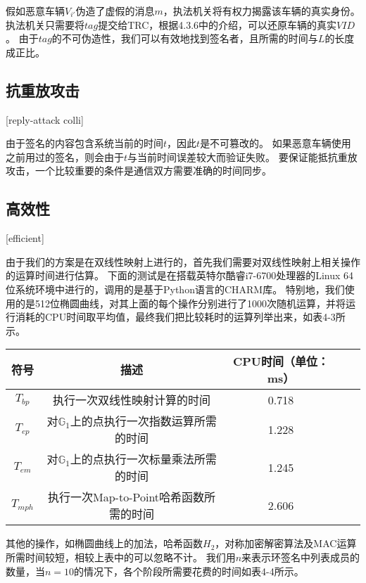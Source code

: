 假如恶意车辆$V_{i'}$伪造了虚假的消息$m$，执法机关将有权力揭露该车辆的真实身份。
执法机关只需要将$tag$提交给TRC，根据4.3.6中的介绍，可以还原车辆的真实$VID$。
由于$tag$的不可伪造性，我们可以有效地找到签名者，且所需的时间与$L$的长度成正比。

\subsection{抗重放攻击}[reply-attack colli]

由于签名的内容包含系统当前的时间$t$，因此$t$是不可篡改的。
如果恶意车辆使用之前用过的签名，则会由于$t$与当前时间误差较大而验证失败。
要保证能抵抗重放攻击，一个比较重要的条件是通信双方需要准确的时间同步。

\subsection{高效性}[efficient]

由于我们的方案是在双线性映射上进行的，首先我们需要对双线性映射上相关操作的运算时间进行估算。
下面的测试是在搭载英特尔酷睿i7-6700处理器的Linux 64位系统环境中进行的，调用的是基于Python语言的CHARM库\cite{charm13}。
特别地，我们使用的是512位椭圆曲线，对其上面的每个操作分别进行了1000次随机运算，并将运行消耗的CPU时间取平均值，最终我们把比较耗时的运算列举出来，如表4-3所示。

\begin{table}[htbp]
\vspace{0.5em}\centering\wuhao
\begin{tabular}{ccccc}
\toprule[1.5pt]
 符号 & 描述 & CPU时间（单位：ms）\\
\midrule[1pt]
 $T_{bp}$ & 执行一次双线性映射计算的时间 & 0.718 \\
 $T_{ep}$ & 对$\mathbb{G}_1$上的点执行一次指数运算所需的时间 & 1.228 \\
 $T_{em}$ & 对$\mathbb{G}_1$上的点执行一次标量乘法所需的时间 & 1.245 \\
 $T_{mph}$& 执行一次Map-to-Point哈希函数所需的时间 & 2.606 \\
\bottomrule[1.5pt]
\end{tabular}
\end{table}

其他的操作，如椭圆曲线上的加法，哈希函数$H_2$，对称加密解密算法及MAC运算所需时间较短，相较上表中的可以忽略不计。
我们用$n$来表示环签名中列表成员的数量，当$n=10$的情况下，各个阶段所需要花费的时间如表4-4所示。

